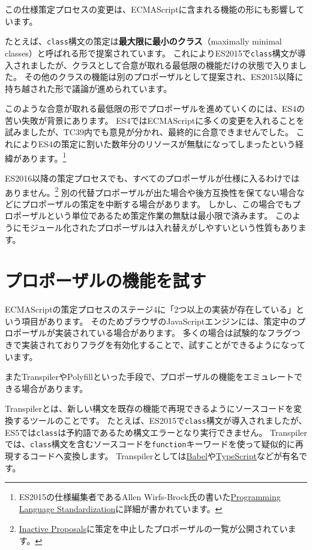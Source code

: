 この仕様策定プロセスの変更は、ECMAScriptに含まれる機能の形にも影響しています。

たとえば、\texttt{class}構文の策定は\textbf{最大限に最小のクラス}（maximally
minimal classes）と呼ばれる形で提案されています。
これによりES2015で\texttt{class}構文が導入されましたが、クラスとして合意が取れる最低限の機能だけの状態で入りました。
その他のクラスの機能は別のプロポーザルとして提案され、ES2015以降に持ち越された形で議論が進められています。

このような合意が取れる最低限の形でプロポーザルを進めていくのには、ES4の苦い失敗が背景にあります。
ES4ではECMAScriptに多くの変更を入れることを試みましたが、TC39内でも意見が分かれ、最終的に合意できませんでした。
これによりES4の策定に割いた数年分のリソースが無駄になってしまったという経緯があります。\footnote{ES2015の仕様編集者であるAllen
  Wirfs-Brock氏の書いた\href{http://wirfs-brock.com/allen/files/papers/standpats-asianplop2016.pdf}{Programming
  Language Standardization}に詳細が書かれています。}

ES2016以降の策定プロセスでも、すべてのプロポーザルが仕様に入るわけではありません。\footnote{\href{https://github.com/tc39/proposals/blob/master/inactive-proposals.md}{Inactive
  Proposals}に策定を中止したプロポーザルの一覧が公開されています。}
別の代替プロポーザルが出た場合や後方互換性を保てない場合などにプロポーザルの策定を中断する場合があります。
しかし、この場合でもプロポーザルという単位であるため策定作業の無駄は最小限で済みます。
このようにモジュール化されたプロポーザルは入れ替えがしやすいという性質もあります。

\hypertarget{try-proposal}{%
\section{プロポーザルの機能を試す}\label{try-proposal}}

ECMAScriptの策定プロセスのステージ4に「2つ以上の実装が存在している」という項目があります。
そのためブラウザのJavaScriptエンジンには、策定中のプロポーザルが実装されている場合があります。
多くの場合は試験的なフラグつきで実装されておりフラグを有効化することで、試すことができるようになっています。

またTranspilerやPolyfillといった手段で、プロポーザルの機能をエミュレートできる場合があります。

Transpilerとは、新しい構文を既存の機能で再現できるようにソースコードを変換するツールのことです。
たとえば、ES2015で\texttt{class}構文が導入されましたが、ES5では\texttt{class}は予約語であるため構文エラーとなり実行できません。
Transpilerでは、\texttt{class}構文を含むソースコードを\texttt{function}キーワードを使って疑似的に再現するコードへ変換します。
Transpilerとしては\href{https://babeljs.io/}{Babel}や\href{https://www.typescriptlang.org/}{TypeScript}などが有名です。

